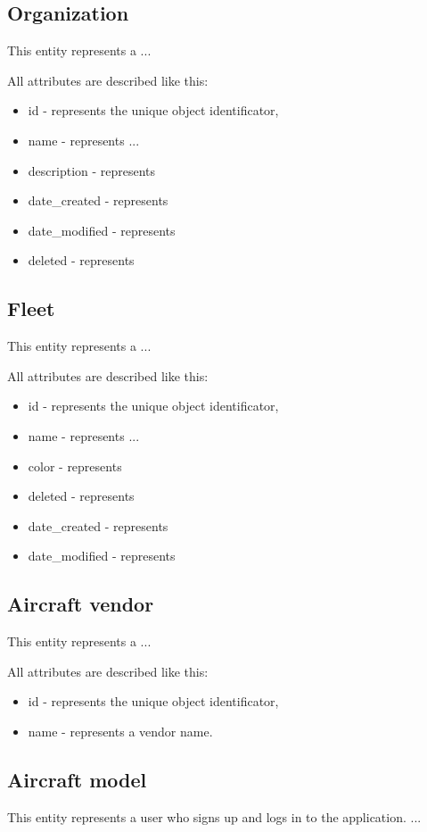 \subsection{Organization}\label{subsec:organization}
This entity represents a ...

All attributes are described like this:
\begin{itemize}
    \item id - represents the unique object identificator,
    \item name - represents ...
    \item description - represents
    \item date\_created - represents
    \item date\_modified - represents
    \item deleted - represents
\end{itemize}

\subsection{Fleet}\label{subsec:fleet}
This entity represents a ...

All attributes are described like this:
\begin{itemize}
    \item id - represents the unique object identificator,
    \item name - represents ...
    \item color - represents
    \item deleted - represents
    \item date\_created - represents
    \item date\_modified - represents
\end{itemize}

\subsection{Aircraft vendor}\label{subsec:aircraft-vendor}
This entity represents a ...

All attributes are described like this:
\begin{itemize}
    \item id - represents the unique object identificator,
    \item name - represents a vendor name.
\end{itemize}

\subsection{Aircraft model}\label{subsec:aircraft-model}
This entity represents a user who signs up and logs in to the application.
...

